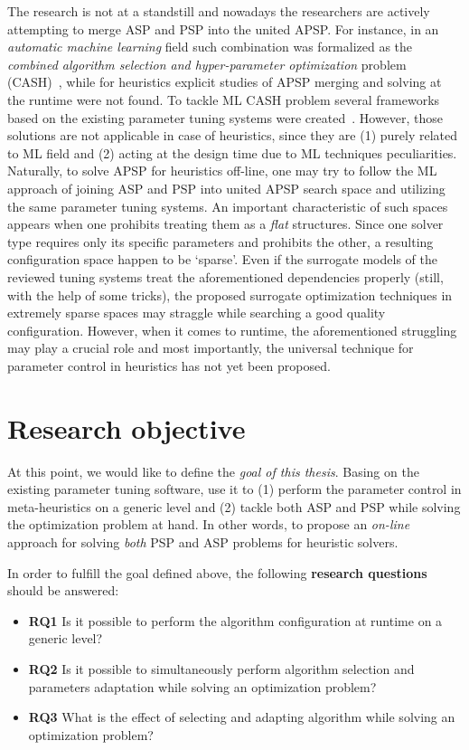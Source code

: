 The research is not at a standstill and nowadays the researchers are actively attempting to merge ASP and PSP into the united APSP. For instance, in an \emph{automatic machine learning} field such combination was formalized as the \emph{combined algorithm selection and hyper-parameter optimization} problem (CASH)~\cite{thornton2013auto}, while for heuristics explicit studies of APSP merging and solving at the runtime were not found. To tackle ML CASH problem several frameworks based on the existing parameter tuning systems were created~\cite{thornton2013auto,feurer2015efficient,olson2019tpot}. However, those solutions are not applicable in case of heuristics, since they are (1) purely related to ML field and (2) acting at the design time due to ML techniques peculiarities. Naturally, to solve APSP for heuristics off-line, one may try to follow the ML approach of joining ASP and PSP into united APSP search space and utilizing the same parameter tuning systems. An important characteristic of such spaces appears when one prohibits treating them as a \emph{flat} structures. Since one solver type requires only its specific parameters and prohibits the other, a resulting configuration space happen to be `sparse'. Even if the surrogate models of the reviewed tuning systems treat the aforementioned dependencies properly (still, with the help of some tricks), the proposed surrogate optimization techniques in extremely sparse spaces may straggle while searching a good quality configuration. However, when it comes to runtime, the aforementioned struggling may play a crucial role and most importantly, the universal technique for parameter control in heuristics has not yet been proposed.

\section{Research objective}\label{intro: research objective}
At this point, we would like to define the \emph{goal of this thesis}. Basing on the existing parameter tuning software, use it to (1) perform the parameter control in meta-heuristics on a generic level and (2) tackle both ASP and PSP while solving the optimization problem at hand. In other words, to propose an \emph{on-line} approach for solving \emph{both} PSP and ASP problems for heuristic solvers.

In order to fulfill the goal defined above, the following \textbf{research questions} should be answered:
\begin{itemize}
	\item \textbf{RQ1} Is it possible to perform the algorithm configuration at runtime on a generic level?
	
	\item \textbf{RQ2} Is it possible to simultaneously perform algorithm selection and parameters adaptation while solving an optimization problem?
	
	\item \textbf{RQ3} What is the effect of selecting and adapting algorithm while solving an optimization problem?
\end{itemize}


